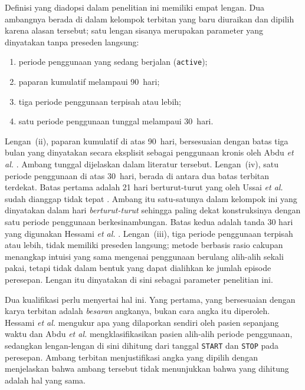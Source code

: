 Definisi yang diadopsi dalam penelitian ini memiliki empat lengan. Dua ambangnya berada di
dalam kelompok terbitan yang baru diuraikan dan dipilih karena alasan tersebut; satu lengan sisanya
merupakan parameter yang dinyatakan tanpa preseden langsung:

\begin{enumerate}
    \item[(i)] periode penggunaan yang sedang berjalan (\texttt{active});
    \item[(ii)] paparan kumulatif melampaui 90~hari;
    \item[(iii)] tiga periode penggunaan terpisah atau lebih;
    \item[(iv)] satu periode penggunaan tunggal melampaui 30~hari.
\end{enumerate}

Lengan~(ii), paparan kumulatif di atas 90~hari, bersesuaian dengan batas tiga bulan yang
dinyatakan secara eksplisit sebagai penggunaan kronis oleh Abdu \textit{et al.}
\cite{abdu2020}. Ambang tunggal dijelaskan dalam literatur tersebut. Lengan~(iv), satu
periode penggunaan di atas 30~hari, berada di antara dua batas terbitan terdekat. Batas
pertama adalah 21 hari berturut-turut yang oleh Ussai \textit{et al.} sudah dianggap tidak
tepat \cite{ussai2015}. Ambang itu satu-satunya dalam kelompok ini yang dinyatakan
dalam hari \emph{berturut-turut} sehingga paling dekat konstruksinya dengan satu periode
penggunaan berkesinambungan. Batas kedua adalah tanda 30 hari yang digunakan Hessami
\textit{et al.} \cite{hessami2025}. Lengan~(iii), tiga periode penggunaan terpisah atau
lebih, tidak memiliki preseden langsung; metode berbasis rasio cakupan
\cite{campbell2022}\cite{kikuchi2021} menangkap intuisi yang sama mengenai
penggunaan berulang alih-alih sekali pakai, tetapi tidak dalam bentuk yang dapat dialihkan ke
jumlah episode peresepan. Lengan itu dinyatakan di sini sebagai parameter penelitian ini.

Dua kualifikasi perlu menyertai hal ini. Yang pertama, yang bersesuaian dengan
karya terbitan adalah \emph{besaran} angkanya, bukan cara angka itu diperoleh. Hessami
\textit{et al.} mengukur apa yang dilaporkan sendiri oleh pasien sepanjang waktu dan Abdu
\textit{et al.} mengklasifikasikan pasien alih-alih periode penggunaan, sedangkan lengan-lengan
di sini dihitung dari tanggal \texttt{START} dan \texttt{STOP} pada peresepan. Ambang terbitan
menjustifikasi angka yang dipilih dengan menjelaskan bahwa ambang tersebut tidak menunjukkan bahwa yang dihitung adalah hal
yang sama.

